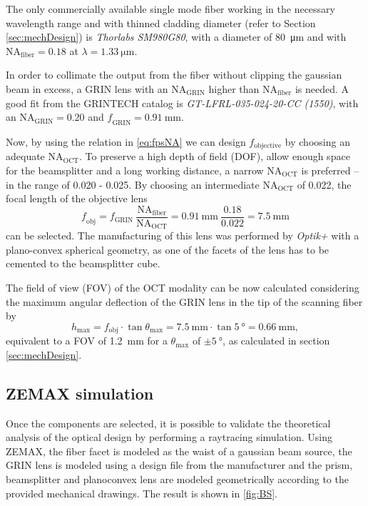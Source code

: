 The only commercially available single mode fiber working in the necessary wavelength range and with thinned cladding diameter (refer to Section \ref{sec:mechDesign}) is \textit{Thorlabs SM980G80}, with a diameter of \SI{80}{\micro\meter} and with $\mathrm{NA_\mathrm{fiber}} = 0.18$ at $\lambda = \SI{1.33}{\micro\meter}$. 

In order to collimate the output from the fiber without clipping the gaussian beam in excess, a GRIN lens with an $\mathrm{NA_{GRIN}}$ higher than $\mathrm{NA_{fiber}}$ is needed. A good fit from the GRINTECH catalog is \textit{GT-LFRL-035-024-20-CC (1550)}, with an $\mathrm{NA_\mathrm{GRIN}} = 0.20$ and $\mathit{f_\mathrm{GRIN}} = \SI{0.91}{\milli\meter}$. 

Now, by using the relation in \autoref{eq:fpsNA} we can design $f_\mathrm{objective}$ by choosing an adequate $\mathrm{NA_\mathrm{OCT}}$. To preserve a high depth of field (DOF), allow enough space for the beamsplitter and a long working distance, a narrow $\mathrm{NA_\mathrm{OCT}}$ is preferred -- in the range of 0.020 - 0.025. By choosing an intermediate $\mathrm{NA_\mathrm{OCT}}$ of 0.022, the focal length of the objective lens 
\begin{equation}
\mathit{f_\mathrm{obj}} = f_\mathrm{GRIN}\ \frac{\mathrm{NA_\mathrm{fiber}}}{\mathrm{NA_\mathrm{OCT}}}  = \SI{0.91}{\milli\meter}\ \frac{0.18}{0.022} = \SI{7.5}{\milli\meter}
\end{equation}
can be selected. The manufacturing of this lens was performed by \textit{Optik+} with a plano-convex spherical geometry, as one of the facets of the lens has to be cemented to the beamsplitter cube.

The field of view (FOV) of the OCT modality can be now calculated considering the maximum angular deflection of the GRIN lens in the tip of the scanning fiber by 
\begin{equation}
h_\mathrm{max} = f_\mathrm{obj}\cdot \tan  \theta_\mathrm{max} = \SI{7.5}{\milli\meter} \cdot \tan \SI{5}{\degree} = \SI{0.66}{\milli\meter}, 
\end{equation}
equivalent to a FOV of \SI{1.2}{\milli\meter} for a $\theta_\mathrm{max} $ of $ \pm \SI{5}{\degree}$, as calculated in section \ref{sec:mechDesign}.


\subsection{ZEMAX simulation}
\label{sec:ZEMAX}

Once the components are selected, it is possible to validate the theoretical analysis of the optical design by  performing a raytracing simulation. Using ZEMAX, the fiber facet is modeled as the waist of a gaussian beam source, the  GRIN lens is modeled using a design file from the manufacturer and the prism, beamsplitter and planoconvex lens are modeled geometrically according to the provided mechanical drawings. The result is shown in \autoref{fig:BS}.

